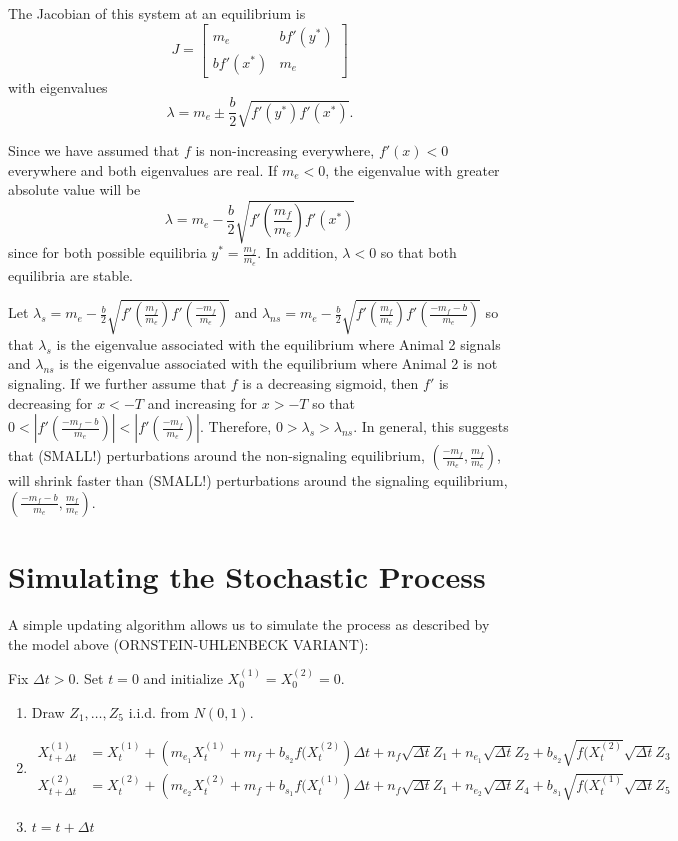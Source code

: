 \documentclass{article}
\begin{document}
The Jacobian of this system at an equilibrium is
$$
J=\left[
\begin{array}{ccccc}
m_e & bf'(y^*) \\
bf'(x^*) & m_e
\end{array}\right] $$
with eigenvalues
$$\lambda=m_e\pm  \frac{b}{2}\sqrt{f'(y^*)f'(x^*)}.$$

Since we have assumed that $f$ is non-increasing everywhere, $f'(x)<0$ everywhere and both eigenvalues are real.  If $m_e<0$, the eigenvalue with greater absolute value will be 
$$\lambda=m_e- \frac{b}{2} \sqrt{f'\left(\frac{m_f}{m_e}\right)f'\left(x^*\right)}$$
since for both possible equilibria $y^*=\frac{m_f}{m_e}$.  In addition, $\lambda<0$ so that both equilibria are stable.


Let $\lambda_s=m_e- \frac{b}{2}\sqrt{f'\left(\frac{m_f}{m_e}\right)f'\left(\frac{-m_f}{m_e}\right)}$ and $\lambda_{ns}=m_e-  \frac{b}{2}\sqrt{f'\left(\frac{m_f}{m_e}\right)f'\left(\frac{-m_f-b}{m_e}\right)}$ so that $\lambda_s$ is the eigenvalue associated with the equilibrium where Animal 2 signals and $\lambda_{ns}$ is the eigenvalue associated with the equilibrium where Animal 2 is not signaling. 
If we further assume that $f$ is a decreasing sigmoid, then $f'$ is decreasing for $x<-T$ and increasing for $x>-T$ so that $0<\left|f'\left(\frac{-m_f-b}{m_e}\right)\right|<\left|f'\left(\frac{-m_f}{m_e}\right)\right|$.  Therefore, $0>\lambda_s>\lambda_{ns}$.  In general, this suggests that (SMALL!) perturbations around the non-signaling equilibrium, $\left(\frac{-m_f}{m_e},\frac{m_f}{m_e}\right)$, will shrink faster than (SMALL!) perturbations around the signaling equilibrium, $\left(\frac{-m_f-b}{m_e},\frac{m_f}{m_e}\right)$.

\section{Simulating the Stochastic Process }
A simple updating algorithm allows us to simulate the process as described by the model above (ORNSTEIN-UHLENBECK VARIANT):

\noindent Fix $\Delta t>0$.  Set $t=0$ and initialize $X_0^{(1)}=X_0^{(2)}=0$.

\begin{enumerate}
\item Draw $Z_1,\dots,Z_5$ i.i.d. from $N(0,1)$.
\item \begin{align*}
X_{t+\Delta t}^{(1)}&=X_t^{(1)}+\left(m_{e_1}X_t^{(1)}+m_f+b_{s_2}f(X_t^{(2)}\right)\Delta t+n_f\sqrt{\Delta t}Z_1+n_{e_1}\sqrt{\Delta t}Z_2+b_{s_2}\sqrt{f(X_t^{(2)}}\sqrt{\Delta t}Z_3\\
X_{t+\Delta t}^{(2)}&=X_t^{(2)}+\left(m_{e_2}X_t^{(2)}+m_f+b_{s_1}f(X_t^{(1)}\right)\Delta t+n_f\sqrt{\Delta t}Z_1+n_{e_2}\sqrt{\Delta t}Z_4+b_{s_1}\sqrt{f(X_t^{(1)}}\sqrt{\Delta t}Z_5
\end{align*}
\item $t=t+\Delta t$


\end{enumerate}
\end{document}
